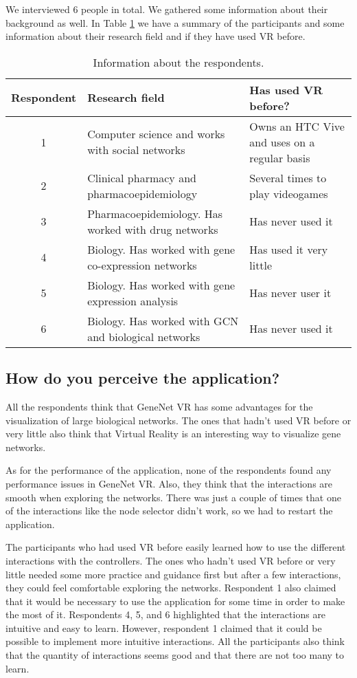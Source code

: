 We interviewed 6 people in total. We gathered some information about their background as well. In Table  \ref{tab:respondents} we have a summary of the participants and some information about their research field and if they have used VR before.

\begin{table}[h!]
\centering
\begin{tabularx}{\textwidth}{c X X}
\hline
Respondent & Research field & Has used VR before? \\
\hline
1 & Computer science and works with social networks  & Owns an HTC Vive and uses on a regular basis \\
2 & Clinical pharmacy and pharmacoepidemiology & Several times to play videogames \\
3 & Pharmacoepidemiology. Has worked with drug networks & Has never used it \\
4 & Biology. Has worked with gene co-expression networks & Has used it very little \\
5 & Biology. Has worked with gene expression analysis & Has never user it \\
6 & Biology. Has worked with GCN and biological networks & Has never used it \\
\hline
\end{tabularx}
\caption{Information about the respondents.}
\label{tab:respondents}
\end{table}

\subsection{How do you perceive the application?}
All the respondents think that GeneNet VR has some advantages for the visualization of large biological networks. The ones that hadn't used VR before or very little also think that Virtual Reality is an interesting way to visualize gene networks.

As for the performance of the application, none of the respondents found any performance issues in GeneNet VR. Also, they think that the interactions are smooth when exploring the networks. There was just a couple of times that one of the interactions like the node selector didn't work, so we had to restart the application.

The participants who had used VR before easily learned how to use the different interactions with the controllers. The ones who hadn't used VR before or very little needed some more practice and guidance first but after a few interactions, they could feel comfortable exploring the networks. Respondent 1 also claimed that it would be necessary to use the application for some time in order to make the most of it. Respondents 4, 5, and 6 highlighted that the interactions are intuitive and easy to learn. However, respondent 1 claimed that it could be possible to implement more intuitive interactions. All the participants also think that the quantity of interactions seems good and that there are not too many to learn.

